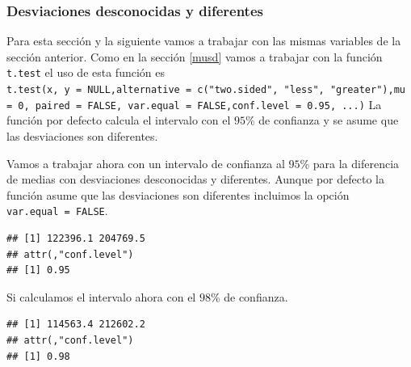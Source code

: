 \documentclass[letterpaper,]{book}
\newenvironment{Shaded}{\begin{snugshade}}{\end{snugshade}}
\newcommand{\DataTypeTok}[1]{\textcolor[rgb]{0.13,0.29,0.53}{#1}}
\newcommand{\FloatTok}[1]{\textcolor[rgb]{0.00,0.00,0.81}{#1}}
\newcommand{\KeywordTok}[1]{\textcolor[rgb]{0.13,0.29,0.53}{\textbf{#1}}}
\newcommand{\NormalTok}[1]{#1}
\newcommand{\OperatorTok}[1]{\textcolor[rgb]{0.81,0.36,0.00}{\textbf{#1}}}
\newcommand{\OtherTok}[1]{\textcolor[rgb]{0.56,0.35,0.01}{#1}}
\begin{document}
\hypertarget{icddd}{%
\subsubsection{Desviaciones desconocidas y diferentes}\label{icddd}}

Para esta sección y la siguiente vamos a trabajar con las mismas variables de la sección anterior. Como en la sección \ref{musd} vamos a trabajar con la función \texttt{t.test} el uso de esta función es \texttt{t.test(x,\ y\ =\ NULL,alternative\ =\ c("two.sided",\ "less",\ "greater"),mu\ =\ 0,\ paired\ =\ FALSE,\ var.equal\ =\ FALSE,conf.level\ =\ 0.95,\ ...)} La función por defecto calcula el intervalo con el \(95\)\% de confianza y se asume que las desviaciones son diferentes.

Vamos a trabajar ahora con un intervalo de confianza al \(95\)\% para la diferencia de medias con desviaciones desconocidas y diferentes. Aunque por defecto la función asume que las desviaciones son diferentes incluimos la opción \texttt{var.equal\ =\ FALSE}.

\begin{Shaded}
\end{Shaded}

\begin{verbatim}
## [1] 122396.1 204769.5
## attr(,"conf.level")
## [1] 0.95
\end{verbatim}

Si calculamos el intervalo ahora con el \(98\)\% de confianza.

\begin{Shaded}
\end{Shaded}

\begin{verbatim}
## [1] 114563.4 212602.2
## attr(,"conf.level")
## [1] 0.98
\end{verbatim}
\end{document}
